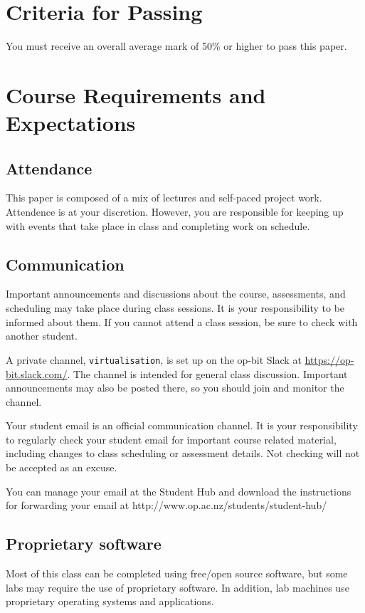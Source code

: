 \documentclass{article}
\begin{document}
\section*{Criteria for Passing}
You must receive an overall average mark of 50\% or higher to pass this paper.

\newpage

\section*{Course Requirements and Expectations}
\subsection*{Attendance}
This paper is composed of a mix of lectures and self-paced project work.  Attendence is at your discretion. 
However, you are responsible for keeping up with events that take place in class and completing work on schedule. 

\subsection*{Communication}
Important announcements and discussions about the course, assessments, and scheduling may take place during class sessions.  It is your responsibility to be informed about them.  If you cannot attend a class session, be sure to check with another student.

A private channel, \texttt{virtualisation}, is set up on the op-bit Slack at \url{https://op-bit.slack.com/}.  The channel is intended for general class discussion.  Important announcements may also be posted there, so you should join and monitor the channel.

Your student email is an official communication channel. It is your responsibility to regularly check your student email for important course related material, including changes to class scheduling or assessment details. Not checking will not be accepted as an excuse.

You can manage your email at the Student Hub and download the instructions for forwarding your email at http://www.op.ac.nz/students/student-hub/

\subsection*{Proprietary software}
Most of this class can be completed using free/open source software, but some labs may require the use of proprietary software.  In addition, lab machines use proprietary operating systems and applications.
\end{document}
